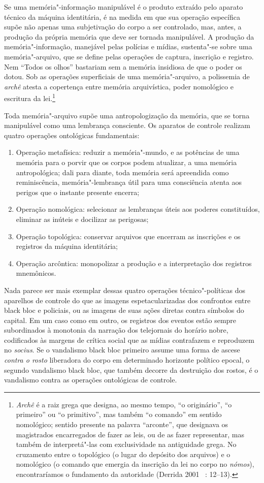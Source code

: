 Se uma memória"-informação manipulável é o produto extraído pelo aparato
técnico da máquina identitária, é na medida em que sua operação
específica supõe não apenas uma subjetivação do corpo a ser controlado,
mas, antes, a produção da própria memória que deve ser tornada
manipulável. A produção da memória"-informação, manejável pelas polícias
e mídias, sustenta"-se sobre uma memória"-arquivo, que se define pelas
operações de captura, inscrição e registro. Nem ``Todos os olhos''
bastariam sem a memória insidiosa de que o poder os dotou. Sob as
operações superficiais de uma memória"-arquivo, a polissemia de
\emph{archê} atesta a copertença entre memória arquivística, poder
nomológico e escritura da lei.\footnote{\emph{Archê} é
  a raiz grega que designa, ao mesmo tempo, ``o originário'', ``o
  primeiro'' ou ``o primitivo'', mas também ``o comando'' em sentido
  nomológico; sentido presente na palavra ``arconte'', que designava os
  magistrados encarregados de fazer as leis, ou de as fazer representar,
  mas também de interpretá"-las com exclusividade na antiguidade grega.
  No cruzamento entre o topológico (o lugar do depósito dos arquivos) e
  o nomológico (o comando que emergia da inscrição da lei no corpo no
  \emph{nómos}), encontraríamos o fundamento da autoridade (Derrida 2001
 ~: 12--13).}

Toda memória"-arquivo supõe uma antropologização da memória, que se torna
manipulável como uma lembrança consciente. Os aparatos de controle
realizam quatro operações ontológicas fundamentais:

\begin{enumerate}
\item Operação
metafísica: reduzir a memória"-mundo, e as potências de uma memória para
o porvir que os corpos podem atualizar, a uma memória antropológica;
dali para diante, toda memória será apreendida como reminiscência,
memória"-lembrança útil para uma consciência atenta aos perigos que o
instante presente encerra;
\item Operação nomológica: selecionar as
lembranças úteis aos poderes constituídos, eliminar as inúteis e
docilizar as perigosas;
\item Operação topológica: conservar arquivos que
encerram as inscrições e os registros da máquina identitária;
\item Operação arcôntica: monopolizar a produção e a interpretação dos
registros mnemônicos.
\end{enumerate}

Nada parece ser mais exemplar dessas quatro operações técnico"-políticas
dos aparelhos de controle do que as imagens espetacularizadas dos
confrontos entre black bloc e policiais, ou as imagens de suas ações
diretas contra símbolos do capital. Em um caso como em outro, os
registros dos eventos estão sempre subordinados à monotonia da narração
dos telejornais do horário nobre, codificados às margens de crítica
social que as mídias contrafazem e reproduzem no \emph{socius}. Se o
vandalismo black bloc primeiro assume uma forma de ascese \emph{contra o
rosto} liberadora do corpo em determinado horizonte político epocal, o
segundo vandalismo black bloc, que também decorre da destruição dos
rostos, é o vandalismo contra as operações ontológicas de controle.

